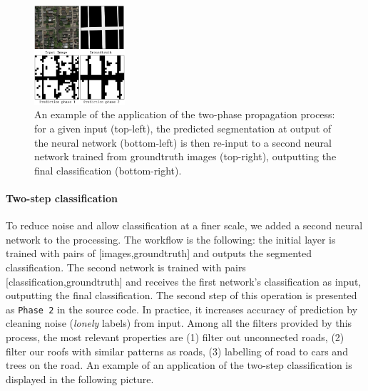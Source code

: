\documentclass[fleqn,9 pt]{SelfArx} %
\begin{document}
\begin{sloppypar}
\begin{figure}[H]
\centering
\includegraphics[width=0.3\textwidth]{figures/two_phases_conv2d.pdf}
\caption{An example of the application of the two-phase propagation process: for a given input (top-left), the predicted segmentation at output of the neural network (bottom-left) is then re-input to a second neural network trained from groundtruth images (top-right), outputting the final classification (bottom-right).}
\end{figure}

\paragraph{Two-step classification} 

To reduce noise and allow classification at a finer scale, we added a second neural network to the processing. The workflow is the following: the initial layer is trained with pairs of [images,groundtruth] and outputs the segmented classification. The second network is trained with pairs [classification,groundtruth] and receives the first network's classification as input, outputting the final classification. The second step of this operation is presented as \texttt{Phase 2} in the source code. In practice, it increases accuracy of prediction by cleaning noise (\textit{lonely} labels) from input. Among all the filters provided by this process, the most relevant properties are (1) filter out unconnected roads, (2) filter our roofs with similar patterns as roads, (3) labelling of road to cars and trees on the road. An example of an application of the two-step classification is displayed in the following picture.



\end{sloppypar}
\end{document}
